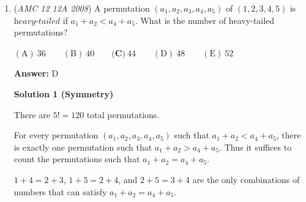 \begin{enumerate}
 We start by finding the length of $AD$ and $BD$ as in solution 1. Using the angle bisector theorem, we see that $AD = \frac{15}{7}$ and $BD = \frac{20}{7}$. Using Stewart's Theorem gives us the equation $5d^2 + \frac{1500}{49} = \frac{240}{7} + \frac{180}{7}$, where $d$ is the length of $CD$. Solving gives us $d = \frac{12\sqrt{2}}{7}$, so $CD = \frac{12\sqrt{2}}{7}$.

 Call the incenters of triangles $ACD$ and $BCD$ $O_a$ and $O_b$ respectively. Since $O_a$ is an incenter, it lies on the angle bisector of $\angle ACD$. Similarly, $O_b$ lies on the angle bisector of $\angle BCD$. Call the point on $CD$ tangent to $O_a$ $M$, and the point tangent to $O_b$ $N$. Since $\triangle CO_aM$ and $\triangle CO_bN$ are right, and $\angle O_aCM = \angle O_bCN$, $\triangle CO_aM \sim \triangle CO_bN$. Then, $\frac{r_a}{r_b} = \frac{CM}{CN}$. 

 We now use common tangents to find the length of $CM$ and $CN$. Let $CM = m$, and the length of the other tangents be $n$ and $p$. Since common tangents are equal, we can write that $m + n = \frac{12\sqrt{2}}{7}$, $n + p = \frac{15}{7}$ and $m + p = 3$. Solving gives us that $CM = m = \frac{6\sqrt{2} + 3}{7}$. Similarly, $CN = \frac{6\sqrt{2} + 4}{7}$. 

 We see now that $\frac{r_a}{r_b} = \frac{\frac{6\sqrt{2} + 3}{7}}{\frac{6\sqrt{2} + 4}{7}} = \frac{6\sqrt{2} + 3}{6\sqrt{2} + 4} = \frac{60-6\sqrt{2}}{56} = \frac{3}{28}(10 - \sqrt{2}) \Rightarrow \boxed{E}$



	\item (\textit{AMC 12 12A 2008}) A permutation $(a_1,a_2,a_3,a_4,a_5)$ of $(1,2,3,4,5)$ is $\textit{heavy-tailed}$ if $a_1 + a_2 < a_4 + a_5$.  What is the number of heavy-tailed permutations?


 $\mathrm{(A)}\ 36\qquad\mathrm{(B)}\ 40\qquad\textbf{(C)}\ 44\qquad\mathrm{(D)}\ 48\qquad\mathrm{(E)}\ 52$

 \textbf{Answer: }D



\textbf{Solution 1 (Symmetry)}

There are $5!=120$ total permutations. 

 For every permutation $(a_1,a_2,a_3,a_4,a_5)$ such that $a_1 + a_2 < a_4 + a_5$, there is exactly one permutation such that $a_1 + a_2 > a_4 + a_5$. Thus it suffices to count the permutations such that $a_1 + a_2 = a_4 + a_5$. 

 $1+4=2+3$, $1+5=2+4$, and $2+5=3+4$ are the only combinations of numbers that can satisfy $a_1 + a_2 = a_4 + a_5$. 


\end{enumerate}
